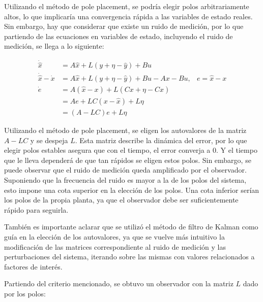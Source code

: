 \documentclass[a4paper,10pt]{article}
\begin{document}
Utilizando el método de pole placement, se podría elegir polos arbitrariamente altos, lo que implicaría una convergencia rápida a las variables de estado reales. Sin embargo, hay que considerar que existe un ruido de medición, por lo que partiendo de las ecuaciones en variables de estado, incluyendo el ruido de medición, se llega a lo siguiente:

\begin{align*}
    \dot{\hat{x}} &= A \hat{x} + L(y + \eta - \hat{y}) + B u  \\
    \dot{\hat{x}} - \dot{x} &= A \hat{x} + L(y + \eta - \hat{y}) + Bu - Ax - Bu, & e = \hat{x} - x \\
    \dot{e} &= A (\hat{x} - x) + L(C x + \eta - C \hat{x}) \\
     &= A e + L C (x - \hat{x}) + L \eta \\
     &= (A - LC) e + L \eta
\end{align*}

Utilizando el método de pole placement, se eligen los autovalores de la matriz $A-LC$ y se despeja $L$. Esta matriz describe la dinámica del error, por lo que elegir polos estables asegura que con el tiempo, el error converja a $0$. Y el tiempo que le lleva dependerá de que tan rápidos se eligen estos polos. Sin embargo, se puede observar que el ruido de medición queda amplificado por el observador. Suponiendo que la frecuencia del ruido es mayor a la de los polos del sistema, esto impone una cota superior en la elección de los polos. Una cota inferior serían los polos de la propia planta, ya que el observador debe ser suficientemente rápido para seguirla.

También es importante aclarar que se utilizó el método de filtro de Kalman como guía en la elección de los autovalores, ya que se vuelve más intuitivo la modificación de las matrices correspondiente al ruido de medición y las perturbaciones del sistema, iterando sobre las mismas con valores relacionados a factores de interés. 

Partiendo del criterio mencionado, se obtuvo un observador con la matriz $L$ dado por los polos:
\end{document}
